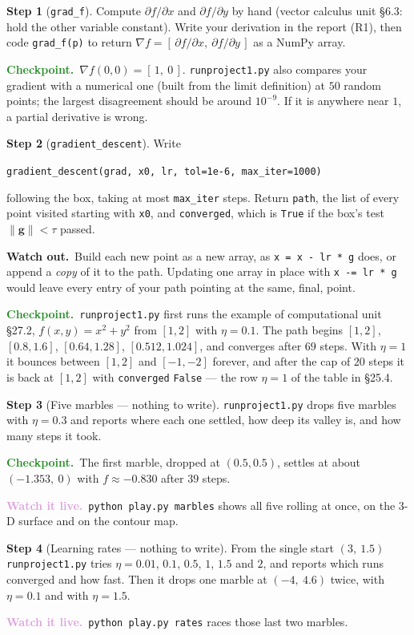 \documentclass[11pt]{article}
\theoremstyle{definition}
\newtheorem{step}{Step}[section]
\newcommand{\heads}[1]{\par\smallskip\noindent
  {\small\sffamily\textcolor{BrickRed}{\textbf{Watch out.}}\ #1}\par\smallskip}
\newcommand{\checkpoint}[1]{\par\smallskip\noindent
  {\small\sffamily\textcolor{ForestGreen}{\textbf{Checkpoint.}}\ #1}\par\smallskip}
\newcommand{\watch}[1]{\par\smallskip\noindent
  {\small\sffamily\textcolor{Plum}{\textbf{Watch it live.}}\ #1}\par\smallskip}
\newcommand{\vc}[1]{\mathbf{#1}}
\newcommand{\norm}[1]{\lVert #1\rVert}
\newcommand{\grad}{\nabla}
\newcommand{\file}[1]{\texttt{#1}}
\begin{document}
\begin{step}[\texttt{grad\_f}]
Compute $\partial f/\partial x$ and $\partial f/\partial y$ by hand (vector
calculus unit \S6.3: hold the other variable constant). Write your derivation
in the report (R1), then code \texttt{grad\_f(p)} to return
$\grad f=[\,\partial f/\partial x,\ \partial f/\partial y\,]$ as a NumPy array.
\checkpoint{$\grad f(0,0)=[\,1,\ 0\,]$. \file{runproject1.py} also compares your gradient
with a numerical one (built from the limit definition) at $50$ random points;
the largest disagreement should be around $10^{-9}$. If it is anywhere near
$1$, a partial derivative is wrong.}
\end{step}

\begin{step}[\texttt{gradient\_descent}]
Write
\begin{center}
\texttt{gradient\_descent(grad, x0, lr, tol=1e-6, max\_iter=1000)}
\end{center}
following the box, taking at most \texttt{max\_iter} steps. Return
\texttt{path}, the list of every point visited starting with \texttt{x0}, and
\texttt{converged}, which is \texttt{True} if the box's test $\norm{\vc{g}}<\tau$ passed.
\heads{Build each new point as a new array, as \texttt{x = x - lr * g} does,
or append a \emph{copy} of it to the path. Updating one array in place with
\texttt{x -= lr * g} would leave every entry of your path pointing at the same,
final, point.}
\checkpoint{\file{runproject1.py} first runs the example of computational unit \S27.2,
$f(x,y)=x^{2}+y^{2}$ from $[1,2]$ with $\eta=0.1$. The path begins $[1,2]$,
$[0.8,1.6]$, $[0.64,1.28]$, $[0.512,1.024]$, and converges after $69$ steps.
With $\eta=1$ it bounces between $[1,2]$ and $[-1,-2]$ forever, and after the
cap of $20$ steps it is back at $[1,2]$ with \texttt{converged} \texttt{False}
--- the row $\eta=1$ of the table in \S25.4.}
\end{step}

\begin{step}[Five marbles --- nothing to write]
\file{runproject1.py} drops five marbles with $\eta=0.3$ and reports where each one
settled, how deep its valley is, and how many steps it took.
\checkpoint{The first marble, dropped at $(0.5,0.5)$, settles at about
$(-1.353,\ 0)$ with $f\approx-0.830$ after $39$ steps.}
\watch{\texttt{python play.py marbles} shows all five rolling at once, on the
3-D surface and on the contour map.}
\end{step}

\begin{step}[Learning rates --- nothing to write]
From the single start $(3,\ 1.5)$ \file{runproject1.py} tries $\eta=0.01$, $0.1$, $0.5$,
$1$, $1.5$ and $2$, and reports which runs converged and how fast. Then it
drops one marble at $(-4,\ 4.6)$ twice, with $\eta=0.1$ and with $\eta=1.5$.
\watch{\texttt{python play.py rates} races those last two marbles.}
\end{step}
\end{document}
